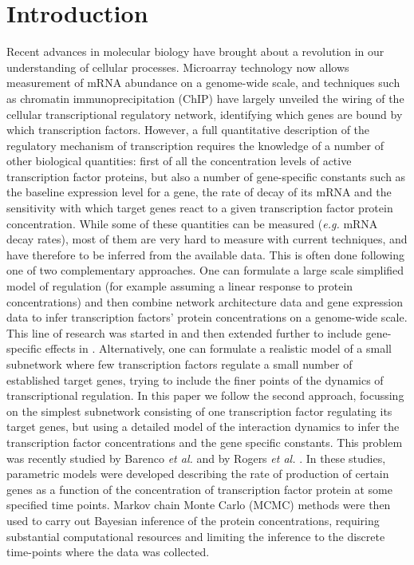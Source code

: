 \documentclass[english]{article}
\begin{document}
\section*{Introduction}
Recent advances in molecular biology  have brought about a revolution in our
understanding of cellular processes. Microarray technology now allows 
measurement of mRNA abundance on a genome-wide scale, and techniques such as
chromatin immunoprecipitation (ChIP) have largely
unveiled the wiring of the cellular transcriptional regulatory network, 
identifying which genes are bound by which transcription factors.
However, a full quantitative description of the regulatory mechanism of
transcription requires the knowledge of a number of other biological 
quantities: first of all the concentration levels of active 
transcription factor proteins, but also a number of gene-specific constants 
such as the baseline expression level for a gene, the rate of decay of its
mRNA and the sensitivity with which target genes
react to a given transcription factor protein concentration. While some
of these quantities can be measured (\emph{e.g.} mRNA decay rates), 
most of them are very hard to measure with current techniques, and have 
therefore to be inferred from the available data.
This
is often done following one of two complementary approaches. One can formulate
a large scale simplified model of regulation (for example assuming a linear
response to protein concentrations) and then combine network architecture data
and gene expression data to infer
transcription factors' protein concentrations on a genome-wide scale. This
line of research was started in \cite{Liao:nca03} 
and then extended further to include gene-specific effects in 
\cite{Sabatti06,Sanguinetti:chipdyno06}. 
Alternatively, one can formulate a realistic model of a 
small subnetwork where few
transcription factors regulate a small number of established target genes, 
trying to include the finer points of the dynamics of transcriptional 
regulation. 
In this paper we follow the second approach, focussing on the simplest 
subnetwork consisting of
one transcription factor regulating its target genes, but using a 
detailed model of the interaction dynamics to infer the transcription factor 
concentrations and the gene specific constants. 
This problem was recently studied
by Barenco \emph{et al.} \cite{Barenco:ranked06} and by Rogers \emph{et al.}
\cite{Rogers:model06}. 
In these studies, parametric models were developed describing 
the rate of production of certain
genes as a function of the concentration of transcription factor protein at
some specified time points. Markov chain Monte
Carlo (MCMC) methods were then used to carry out Bayesian inference of the protein 
concentrations,
requiring substantial computational resources and limiting the
inference to the discrete time-points where the data was collected.  
\end{document}
